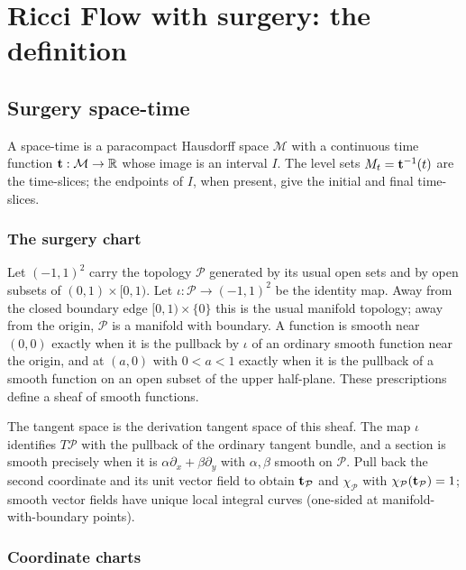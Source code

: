 \chapter{Ricci Flow with surgery: the definition}
\label{chap:ricci-flow-with-surgery}
\label{sect:surgery}

\section{Surgery space-time}

\begin{definition}
\label{def:space-time-general}
A space-time is a paracompact Hausdorff space ${\mathcal M}$ with a continuous
time function ${\bf t}:{\mathcal M}\to\mathbb{R}$ whose image is an interval $I$.
The level sets $M_t={\bf t}^{-1}(t)$ are the time-slices; the endpoints of $I$,
when present, give the initial and final time-slices.
\end{definition}

\subsection{The surgery chart}

Let $(-1,1)^2$ carry the topology ${\mathcal P}$ generated by its usual open
sets and by open subsets of $(0,1)\times[0,1)$. Let
$\iota:{\mathcal P}\to(-1,1)^2$ be the identity map. Away from the closed
boundary edge $[0,1)\times\{0\}$ this is the usual manifold topology; away
from the origin, ${\mathcal P}$ is a manifold with boundary. A function is
smooth near $(0,0)$ exactly when it is the pullback by $\iota$ of an ordinary
smooth function near the origin, and at $(a,0)$ with $0<a<1$ exactly when it is
the pullback of a smooth function on an open subset of the upper half-plane.
These prescriptions define a sheaf of smooth functions.

The tangent space is the derivation tangent space of this sheaf. The map
$\iota$ identifies $T{\mathcal P}$ with the pullback of the ordinary tangent
bundle, and a section is smooth precisely when it is
$\alpha\partial_x+\beta\partial_y$ with $\alpha,\beta$ smooth on
${\mathcal P}$. Pull back the second coordinate and its unit vector field to
obtain ${\bf t}_{\mathcal P}$ and $\chi_{\mathcal P}$ with
$\chi_{\mathcal P}({\bf t}_{\mathcal P})=1$; smooth vector fields have unique
local integral curves (one-sided at manifold-with-boundary points).

\subsection{Coordinate charts}

